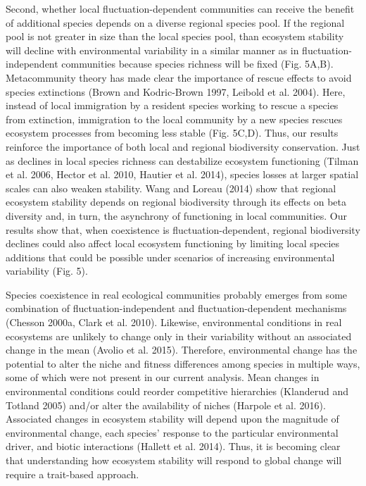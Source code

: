 \documentclass[12pt,]{article}
\begin{document}
Second, whether local fluctuation-dependent communities can receive the
benefit of additional species depends on a diverse regional species
pool. If the regional pool is not greater in size than the local species
pool, than ecosystem stability will decline with environmental
variability in a similar manner as in fluctuation-independent
communities because species richness will be fixed (Fig. 5A,B).
Metacommunity theory has made clear the importance of rescue effects to
avoid species extinctions (Brown and Kodric-Brown 1997, Leibold et al.
2004). Here, instead of local immigration by a resident species working
to rescue a species from extinction, immigration to the local community
by a new species rescues ecosystem processes from becoming less stable
(Fig. 5C,D). Thus, our results reinforce the importance of both local
and regional biodiversity conservation. Just as declines in local
species richness can destabilize ecosystem functioning (Tilman et al.
2006, Hector et al. 2010, Hautier et al. 2014), species losses at larger
spatial scales can also weaken stability. Wang and Loreau (2014) show
that regional ecosystem stability depends on regional biodiversity
through its effects on beta diversity and, in turn, the asynchrony of
functioning in local communities. Our results show that, when
coexistence is fluctuation-dependent, regional biodiversity declines
could also affect local ecosystem functioning by limiting local species
additions that could be possible under scenarios of increasing
environmental variability (Fig. 5).

Species coexistence in real ecological communities probably emerges from
some combination of fluctuation-independent and fluctuation-dependent
mechanisms (Chesson 2000a, Clark et al. 2010). Likewise, environmental
conditions in real ecosystems are unlikely to change only in their
variability without an associated change in the mean (Avolio et al.
2015). Therefore, environmental change has the potential to alter the
niche and fitness differences among species in multiple ways, some of
which were not present in our current analysis. Mean changes in
environmental conditions could reorder competitive hierarchies
(Klanderud and Totland 2005) and/or alter the availability of niches
(Harpole et al. 2016). Associated changes in ecosystem stability will
depend upon the magnitude of environmental change, each species'
response to the particular environmental driver, and biotic interactions
(Hallett et al. 2014). Thus, it is becoming clear that understanding how
ecosystem stability will respond to global change will require a
trait-based approach.
\end{document}
